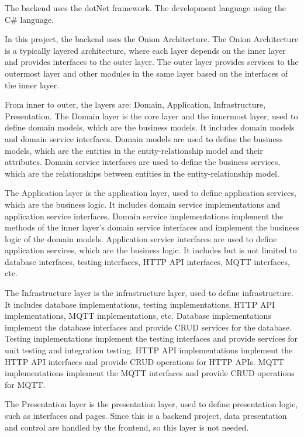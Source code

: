 The backend uses the dotNet framework. The development language using the C\# language.

In this project, the backend uses the Onion Architecture.
The Onion Architecture is a typically layered architecture, 
where each layer depends on the inner layer and provides interfaces to the outer layer.
The outer layer provides services to the outermost layer 
and other modules in the same layer based on the interfaces of the inner layer.

From inner to outer, the layers are: Domain, Application, Infrastructure, Presentation.
The Domain layer is the core layer and the innermost layer, used to define domain models, 
which are the business models.
It includes domain models and domain service interfaces.
Domain models are used to define the business models, 
which are the entities in the entity-relationship model and their attributes.
Domain service interfaces are used to define the business services, 
which are the relationships between entities in the entity-relationship model.

The Application layer is the application layer, 
used to define application services, which are the business logic.
It includes domain service implementations and application service interfaces.
Domain service implementations implement the methods of the inner layer's domain service 
interfaces and implement the business logic of the domain models.
Application service interfaces are used to define application services, 
which are the business logic.
It includes but is not limited to database interfaces, testing interfaces, 
HTTP API interfaces, MQTT interfaces, etc.

The Infrastructure layer is the infrastructure layer, used to define infrastructure.
It includes database implementations, testing implementations, 
HTTP API implementations, MQTT implementations, etc.
Database implementations implement the database interfaces 
and provide CRUD services for the database.
Testing implementations implement the testing interfaces 
and provide services for unit testing and integration testing.
HTTP API implementations implement the HTTP API interfaces 
and provide CRUD operations for HTTP APIs.
MQTT implementations implement the MQTT interfaces 
and provide CRUD operations for MQTT.

The Presentation layer is the presentation layer, used to define presentation logic, 
such as interfaces and pages. Since this is a backend project,
data presentation and control are handled by the frontend, 
so this layer is not needed.


